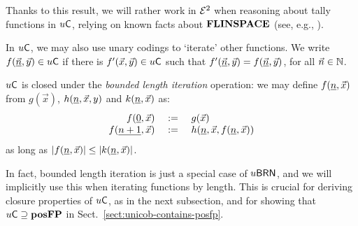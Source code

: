 \documentclass{lmcs}
\begin{document}

\noindent
Thanks to this result, we will rather work in $\mathcal{E}^2$ when reasoning about tally functions in $u \mathsf{C}$, relying on known facts about $\mathbf{FLINSPACE}$ (see, e.g., \cite{CloKra02}).


\smallskip

In $u \mathsf{C}$, we may also use unary codings to `iterate' other functions.
We write $f(\underline{\vec n}, \vec y) \in u \mathsf{C}$  if there is $f'(\vec x, \vec y ) \in u \mathsf{C}$ such that $f'(\underline{\vec n}, \vec y) = f(\underline{\vec n}, \vec y)$, for all $\vec n \in \mathbb{N}$.

\begin{observation}
	\label{prop:length-iteration}
	$u \mathsf{C}$ is closed under the \emph{bounded length iteration} operation: we may define $f(\underline{n} , \vec x)$ from $g(\vec x)$, $h(\underline{n} , \vec x , y)$ and $k(\underline{n},\vec x)$ as:
	\[
	\begin{array}{rcl}
	f(\underline{0} , \vec x) & \ := \ & g(\vec x) \\
	f(\underline{n+1} , \vec x) & \ := \ & h(\underline{n} , \vec x , f(\underline{n} , \vec x))
	\end{array}
	\]
	as long as $|f(\underline{n},\vec x)|\leq |k(\underline{n},\vec x)|$.
\end{observation}

\noindent
In fact, bounded length iteration is just a special case of $u\mathsf{BRN}$, and we will implicitly use this when iterating functions by length.
This is crucial for deriving closure properties of $u \mathsf{C}$, as in the next subsection, and for showing that $u \mathsf{C} \supseteq \mathbf{pos}\mathbf{FP}$ in Sect.~\ref{sect:unicob-contains-posfp}.
\end{document}
